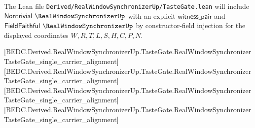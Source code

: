 
The Lean file \texttt{Derived/RealWindowSynchronizerUp/TasteGate.lean} will include $\mathsf{Nontrivial}\ \RealWindowSynchronizerUp$ with an explicit $\mathsf{witness\_pair}$ and $\mathsf{FieldFaithful}\ \RealWindowSynchronizerUp$ by constructor-field injection for the displayed coordinates $W,R,T,L,S,H,C,P,N$.

[BEDC.Derived.RealWindowSynchronizerUp.TasteGate.RealWindowSynchronizerTasteGate\_single\_carrier\_alignment]
[BEDC.Derived.RealWindowSynchronizerUp.TasteGate.RealWindowSynchronizerTasteGate\_single\_carrier\_alignment]
[BEDC.Derived.RealWindowSynchronizerUp.TasteGate.RealWindowSynchronizerTasteGate\_single\_carrier\_alignment]
[BEDC.Derived.RealWindowSynchronizerUp.TasteGate.RealWindowSynchronizerTasteGate\_single\_carrier\_alignment]

